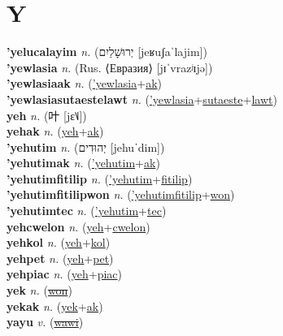 \section{Y}

\textbf{'yelucalayim} \textit{n.} ({\hebrew{}יְרוּשָׁלַיִם} [jeʁuʃaˈlajim])
 \label{'yelucalayim} \\
\textbf{'yewlasia} \textit{n.} (Rus. ⟨Евразия⟩ [jɪˈvrazʲɪjə])
 \label{'yewlasia} \\
\textbf{'yewlasiaak} \textit{n.} (\hyperref['yewlasia]{'yewlasia}+\hyperref[ak]{ak})
 \label{'yewlasiaak} \\
\textbf{'yewlasiasutaestelawt} \textit{n.} (\hyperref['yewlasia]{'yewlasia}+\hyperref[sutaeste]{sutaeste}+\hyperref[lawt]{lawt})
 \label{'yewlasiasutaestelawt} \\
\textbf{yeh} \textit{n.} ({\chinese{}叶} [jɛ˥˩])
 \label{yeh} \\
\textbf{yehak} \textit{n.} (\hyperref[yeh]{yeh}+\hyperref[ak]{ak})
 \label{yehak} \\
\textbf{'yehutim} \textit{n.} ({\hebrew{}יְהוּדִים} [jehuˈdim])
 \label{'yehutim} \\
\textbf{'yehutimak} \textit{n.} (\hyperref['yehutim]{'yehutim}+\hyperref[ak]{ak})
 \label{'yehutimak} \\
\textbf{'yehutimfitilip} \textit{n.} (\hyperref['yehutim]{'yehutim}+\hyperref[fitilip]{fitilip})
 \label{'yehutimfitilip} \\
\textbf{'yehutimfitilipwon} \textit{n.} (\hyperref['yehutimfitilip]{'yehutimfitilip}+\hyperref[won]{won})
 \label{'yehutimfitilipwon} \\
\textbf{'yehutimtec} \textit{n.} (\hyperref['yehutim]{'yehutim}+\hyperref[tec]{tec})
 \label{'yehutimtec} \\
\textbf{yehcwelon} \textit{n.} (\hyperref[yeh]{yeh}+\hyperref[cwelon]{cwelon})
 \label{yehcwelon} \\
\textbf{yehkol} \textit{n.} (\hyperref[yeh]{yeh}+\hyperref[kol]{kol})
 \label{yehkol} \\
\textbf{yehpet} \textit{n.} (\hyperref[yeh]{yeh}+\hyperref[pet]{pet})
 \label{yehpet} \\
\textbf{yehpiac} \textit{n.} (\hyperref[yeh]{yeh}+\hyperref[piac]{piac})
 \label{yehpiac} \\
\textbf{yek} \textit{n.} (\hyperref[won]{\sout{won}})
 \label{yek} \\
\textbf{yekak} \textit{n.} (\hyperref[yek]{yek}+\hyperref[ak]{ak})
 \label{yekak} \\
\textbf{yayu} \textit{v.} (\hyperref[wawi]{\sout{wawi}})
